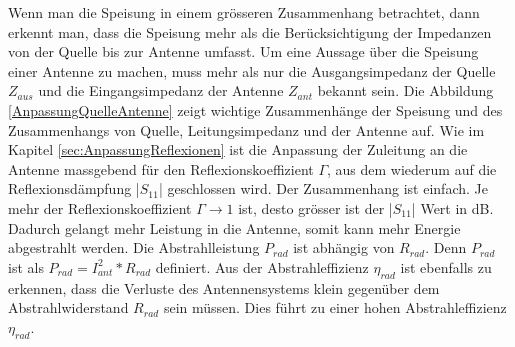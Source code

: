 Wenn man die Speisung in einem grösseren Zusammenhang betrachtet, dann erkennt man, dass die Speisung mehr als die Berücksichtigung der Impedanzen von der Quelle bis zur Antenne umfasst. Um eine Aussage über die Speisung einer Antenne zu machen, muss mehr als nur die Ausgangsimpedanz der Quelle $Z_{aus}$ und die Eingangsimpedanz der Antenne $Z_{ant}$ bekannt sein. Die Abbildung \ref{AnpassungQuelleAntenne} zeigt wichtige Zusammenhänge der Speisung und des Zusammenhangs von Quelle, Leitungsimpedanz und der Antenne auf. Wie im Kapitel \ref{sec:AnpassungReflexionen} ist die Anpassung der Zuleitung an die Antenne massgebend für den Reflexionskoeffizient $\Gamma$, aus dem wiederum auf die Reflexionsdämpfung |$S_{11}$| geschlossen wird. Der Zusammenhang ist einfach. Je mehr der Reflexionskoeffizient $\Gamma\rightarrow 1$ ist, desto grösser ist der |$S_{11}$| Wert in dB. Dadurch gelangt mehr Leistung in die Antenne, somit kann mehr Energie abgestrahlt werden. Die Abstrahlleistung $P_{rad}$ ist abhängig von $R_{rad}$. Denn $P_{rad}$ ist als $P_{rad}=I_{ant}^2*R_{rad}$ definiert. Aus der Abstrahleffizienz $\eta_{rad}$ ist ebenfalls zu erkennen, dass die Verluste des Antennensystems klein gegenüber dem Abstrahlwiderstand $R_{rad}$ sein müssen. Dies führt zu einer hohen Abstrahleffizienz $\eta_{rad}$.


